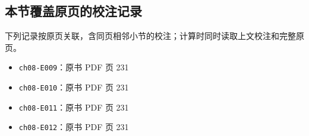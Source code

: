 \documentclass[
  10pt,
  fontset=fandol]{ctexart}
\providecommand{\tightlist}{%
  \setlength{\itemsep}{0pt}\setlength{\parskip}{0pt}}
\begin{document}
\subsection{本节覆盖原页的校注记录}\label{ux672cux8282ux8986ux76d6ux539fux9875ux7684ux6821ux6ce8ux8bb0ux5f55}

下列记录按原页关联，含同页相邻小节的校注；计算时同时读取上文校注和完整原页。

\begin{itemize}
\tightlist
\item
  \texttt{ch08-E009}：原书 PDF 页 231
\item
  \texttt{ch08-E010}：原书 PDF 页 231
\item
  \texttt{ch08-E011}：原书 PDF 页 231
\item
  \texttt{ch08-E012}：原书 PDF 页 231
\end{itemize}
\end{document}
